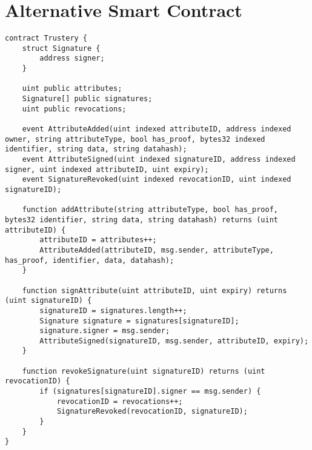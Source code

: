\documentclass[12pt]{report}
\begin{document}
	\section{Alternative Smart Contract}
	\begin{lstlisting}
contract Trustery {
    struct Signature {
        address signer;
    }

    uint public attributes;
    Signature[] public signatures;
    uint public revocations;

    event AttributeAdded(uint indexed attributeID, address indexed owner, string attributeType, bool has_proof, bytes32 indexed identifier, string data, string datahash);
    event AttributeSigned(uint indexed signatureID, address indexed signer, uint indexed attributeID, uint expiry);
    event SignatureRevoked(uint indexed revocationID, uint indexed signatureID);

    function addAttribute(string attributeType, bool has_proof, bytes32 identifier, string data, string datahash) returns (uint attributeID) {
        attributeID = attributes++;
        AttributeAdded(attributeID, msg.sender, attributeType, has_proof, identifier, data, datahash);
    }

    function signAttribute(uint attributeID, uint expiry) returns (uint signatureID) {
        signatureID = signatures.length++;
        Signature signature = signatures[signatureID];
        signature.signer = msg.sender;
        AttributeSigned(signatureID, msg.sender, attributeID, expiry);
    }

    function revokeSignature(uint signatureID) returns (uint revocationID) {
        if (signatures[signatureID].signer == msg.sender) {
            revocationID = revocations++;
            SignatureRevoked(revocationID, signatureID);
        }
    }
}
	\end{lstlisting}
\end{document}
